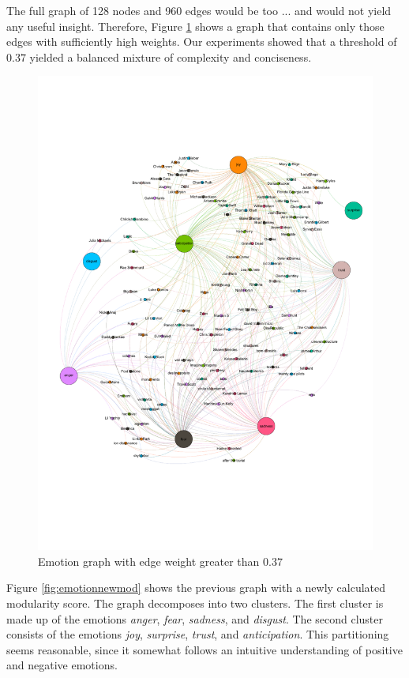 \documentclass[10pt,a4paper]{article}
\begin{document}
		The full graph of 128 nodes and 960 edges would be too ... and would not yield any useful insight. Therefore, Figure \ref{fig:emotiongraph} shows a graph that contains only those edges with sufficiently high weights. Our experiments showed that a threshold of $0.37$ yielded a balanced mixture of complexity and conciseness.
		
		\begin{figure}[htb]
			\centering
			\includegraphics[trim=0mm 50mm 0mm 50mm, clip, width=\linewidth]{data/emotion_graph}
			\caption{Emotion graph with edge weight greater than $0.37$}
			\label{fig:emotiongraph}
		\end{figure}
		
		Figure \ref{fig:emotionnewmod} shows the previous graph with a newly calculated modularity score. The graph decomposes into two clusters. The first cluster is made up of the emotions \textit{anger}, \textit{fear}, \textit{sadness}, and \textit{disgust}. The second cluster consists of the emotions \textit{joy}, \textit{surprise}, \textit{trust}, and \textit{anticipation}. This partitioning seems reasonable, since it somewhat follows an intuitive understanding of positive and negative emotions.
		
\end{document}
